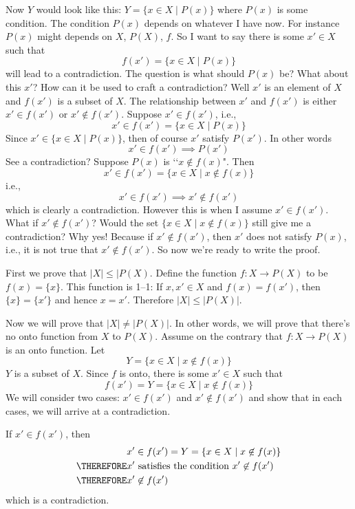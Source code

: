 Now $Y$ would look like this:
$Y = \{x \in X \mid P(x)\}$ where $P(x)$ is some condition.
The condition $P(x)$ depends on whatever I have now.
For instance $P(x)$ might depends on $X$, $P(X)$, $f$.
So I want
to say there is some $x' \in X$ such that 
\[
f(x') = \{x \in X \mid P(x) \}
\]
will lead to a contradiction.
The question is what should $P(x)$ be?
What about this $x'$?
How can it be used to craft a contradiction?
Well $x'$ is an element of $X$
and $f(x')$ is a subset of $X$.
The relationship between $x'$ and $f(x')$ is
either $x' \in f(x')$ or $x' \not\in f(x')$.
Suppose $x' \in f(x')$, i.e.,
\[
x' \in f(x') = \{x \in X \mid P(x) \}
\]
Since $x' \in \{x \in X \mid P(x) \}$, then of course $x'$
satisfy $P(x')$.
In other words
\[
x' \in f(x') \implies P(x')
\]
See a contradiction? Suppose $P(x)$ is \lq\lq$x \not\in f(x)$".
Then
\[
x' \in f(x') = \{x \in X \mid x \not\in f(x) \}
\]
i.e.,
\[
x' \in f(x') \implies x' \not\in f(x')
\]
which is clearly a contradiction.
However this is when I assume $x' \in f(x')$.
What if $x' \not\in f(x')$?
Would the set 
$\{x \in X \mid x \not\in f(x) \}$ still give me a contradiction?
Why yes!
Because if $x' \not\in f(x')$, then $x'$ does not
satisfy $P(x)$, i.e., it is not true that
$x' \not\in f(x')$.
So now we're ready to write the proof.

\proof
First we prove that $|X| \leq |P(X)$.
Define the function $f: X \rightarrow P(X)$ to be
$f(x) = \{x\}$.
This function is 1--1:
If $x,x' \in X$ and $f(x) = f(x')$, then $\{x\} = \{x'\}$
and hence $x = x'$.
Therefore $|X| \leq |P(X)|$.

Now we will prove that $|X| \neq |P(X)|$.
In other words, we will prove that there's no onto function
from $X$ to $P(X)$.
Assume on the contrary that $f: X \rightarrow P(X)$ is an onto function.
Let
\[
Y = \{x \in X \mid x \not\in f(x) \}
\]
$Y$ is a subset of $X$.
Since $f$ is onto, there is some $x' \in X$ such that
\[
f(x') = Y = \{x \in X \mid x \not\in f(x) \}
\]
We will consider two cases: $x' \in f(x')$ and $x' \not\in f(x')$
and show that in each cases, we will arrive at a contradiction.

If $x' \in f(x')$, then
\begin{align*}
  x' &\in f(x') = Y = \{x \in X \mid x \not\in f(x) \} \\
  \THEREFORE x' &\text{ satisfies the condition } x' \not\in f(x') \\
  \THEREFORE x' &\not\in f(x') 
\end{align*}
which is a contradiction.

